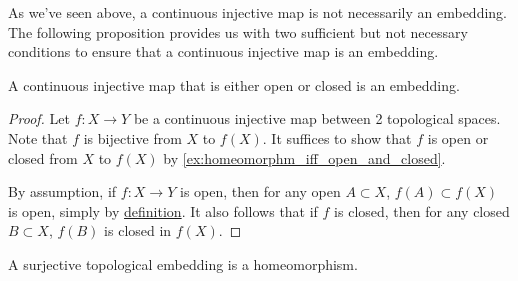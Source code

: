 \documentclass[notoc,notitlepage]{tufte-book}
\begin{document}
As we've seen above, a continuous injective map is not necessarily an embedding. The following
proposition provides us with two sufficient but not necessary conditions to ensure that a
continuous injective map is an embedding.


\begin{propo}\label{propo:sufficient_conditions_to_be_an_embedding}
  A continuous injective map that is either open or closed is an embedding.
\end{propo}

\begin{proof}
  Let $f : X \to Y$ be a continuous injective map between 2 topological spaces. Note that $f$
  is bijective from $X$ to $f(X)$. It suffices to show that $f$ is open or closed from $X$ to
  $f(X)$ by \cref{ex:homeomorphm_iff_open_and_closed}.

  By assumption, if $f : X \to Y$ is open, then for any open $A \subset X$, $f(A) \subset f(X)$
  is open, simply by \hyperref[defn:open_and_closed_maps]{definition}. It also follows that if
  $f$ is closed, then for any closed $B \subset X$, $f(B)$ is closed in $f(X)$.
\end{proof}

\begin{propo}\label{propo:surjective_embeddings_are_homeomorphisms}
  A surjective topological embedding is a homeomorphism.
\end{propo}
\end{document}
